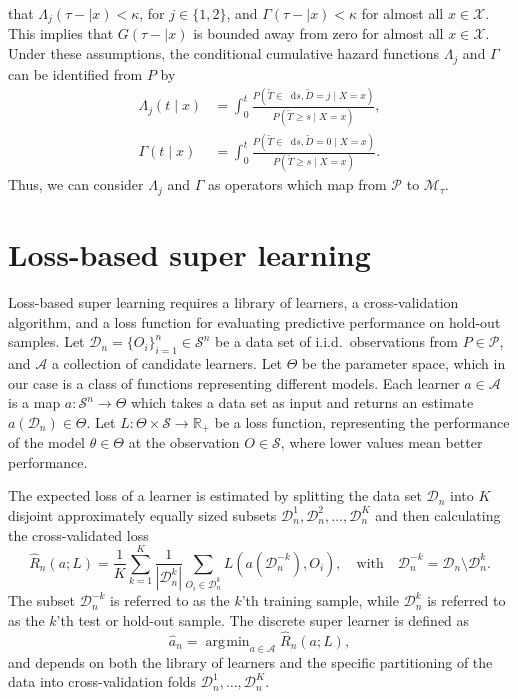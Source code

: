 \documentclass[alpha-refs]{wiley-article}
\newcommand{\R}{\mathbb{R}}
\newcommand*\diff{\mathop{}\!\mathrm{d}}
\newcommand{\1}{\mathds{1}}
\DeclareMathOperator*{\argmin}{\arg\!\min}
\newcommand{\data}{\ensuremath{\mathcal{D}}}
\newcommand{\sample}{\ensuremath{\mathcal{S}}}
\begin{document}
that \(\Lambda_{j}(\tau- \mid x)<\kappa \), for \(j\in\{1,2\}\), and
\(\Gamma(\tau- \mid x)<\kappa\) for almost all \(x\in\mathcal
X\). This implies that \(G(\tau- \mid x)\) is bounded away
from zero for almost all \(x\in\mathcal X\).  Under these assumptions,
the conditional cumulative hazard functions \(\Lambda_{j}\) and
\(\Gamma\) can be identified from \(P\) by
\begin{align}
  \Lambda_{j}(t \mid x) &= \int_0^t\frac{  P(\tilde T \in \diff s, \tilde D=j \mid X=x )}{P(\tilde T \geq s \mid X=x )}, \label{eq:lambdaj}\\
  \Gamma(t \mid x) &= \int_0^t\frac{  P(\tilde T \in \diff s, \tilde D=0 \mid X=x )}{P(\tilde T \geq s \mid X=x )}\label{eq:gamma}.
\end{align}
Thus, we can consider $\Lambda_j$ and \(\Gamma\) as operators which map from
\( \mathcal{P} \) to \(\mathcal M_{\tau}\).

\section{Loss-based super learning}
\label{sec:super-learning}

Loss-based super learning requires a library of learners, a
cross-validation algorithm, and a loss function for evaluating
predictive performance on hold-out samples. Let \(
\data_n=\{O_i\}_{i=1}^n \in \sample^n \) be a data set of i.i.d.\
observations from \( P \in \mathcal{P} \), and $\mathcal{A}$ a
collection of candidate learners. Let \(\Theta\) be the parameter
space, which in our case is a class of functions representing
different models. Each learner \(a \in \mathcal{A}\) is a map \( a
\colon \sample^n \rightarrow \Theta \) which takes a data set as
input and returns an estimate $a(\data_n) \in \Theta$. Let \(L\colon
\Theta \times \sample \rightarrow \R_+\) be a loss function,
representing the performance of the model $\theta \in \Theta$ at the
observation \( O \in \sample \), where lower values mean better
performance.

The expected loss of a learner is estimated by splitting the data set
$\data_n$ into $K$ disjoint approximately equally sized subsets
\(\data_n^1, \data_n^2, \dots, \data_n^K \) and then calculating the
cross-validated loss
\begin{equation}
  \label{eq:cv-risk-est}
  \hat{R}_n(a; L) =
  \frac{1}{K}\sum_{k=1}^{K}
  \frac{1}{| \data_n^{k} |}\sum_{O_i \in \data_n^{k}}
  L
  {
    \left(
      a{ (\data_n^{-k})}
      , O_i
    \right)
  },
  \quad \text{with} \quad
  \data_n^{-k} = \data_n \setminus \data_n^{k}.
\end{equation}
The subset \(\data_n^{-k}\) is referred to as the \(k\)'th training
sample, while \(\data_n^{k}\) is referred to as the \(k\)'th test or
hold-out sample.
The discrete super learner is defined as
\begin{equation*}
\hat{a}_n = \argmin_{a\in\mathcal A}\hat{R}_n(a; L),
\end{equation*}
and depends on both the library of learners and the specific
partitioning of the data into cross-validation folds
\( \data_n^1, \dots, \data_n^K \).
\end{document}
